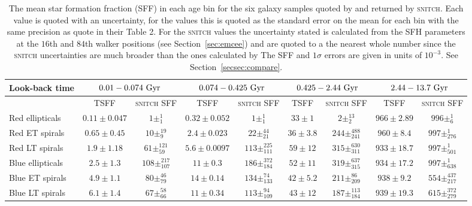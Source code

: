 \documentclass[useAMS,usenatbib]{mn2e}
\begin{document}
\begin{table*}
\centering
\caption{The mean star formation fraction (SFF) in each age bin for the six galaxy samples quoted by \protect\cite[][TSFF]{tojeiro13} and returned by \textsc{snitch}. Each value is quoted with an uncertainty, for the \protect\cite{tojeiro13} values this is quoted as the standard error on the mean for each bin with the same precision as \protect\citeauthor{tojeiro13} quote in their Table 2. For the \textsc{snitch} values the uncertainty stated is calculated from the SFH parameters at the $16$th and $84$th walker positions (see Section~\ref{sec:emcee}) and are quoted to a the nearest whole number since the \textsc{snitch} uncertainties are much broader than the ones calculated by \protect\citeauthor{tojeiro13} The SFF and $1\sigma$ errors are given in units of $10^{-3}$. See Section~\ref{secsec:compare}.}
\label{table:tojeirocompare}
\begin{tabular*}{\textwidth}{l|cc|cc|cc|cc}
                        Look-back time & \multicolumn{2}{c|}{$0.01 - 0.074~\rm{Gyr}$}     & \multicolumn{2}{c|}{$0.074 - 0.425~\rm{Gyr}$} & \multicolumn{2}{c|}{$0.425 - 2.44~\rm{Gyr}$} & \multicolumn{2}{c}{$2.44 - 13.7~\rm{Gyr}$} \\ \hline
                        & TSFF & \textsc{snitch} SFF & TSFF          & \textsc{snitch} SFF          & TSFF          & \textsc{snitch} SFF         & TSFF         & \textsc{snitch} SFF        \\ \hline
Red ellipticals         & $0.11\pm0.047$   &  $1\pm_{1}^{1}$ &  $0.32\pm0.052$  &    $1\pm_{1}^{1}$   &  $33\pm1$   &   $2\pm_{2}^{13}$   &  $966\pm2.89$  &   $996\pm_{6}^{1}$   \\
Red ET spirals  & $0.65\pm0.45$   &  $10\pm_{9}^{19}$ &  $2.4\pm0.023$   &  $22\pm_{21}^{44}$     &  $36\pm3.8$   &   $244\pm_{241}^{488}$  &  $960\pm8.4$  &  $997\pm_{276}^{1}$    \\
Red LT spirals   &  $1.9\pm1.18$   &  $61\pm_{59}^{121}$  &  $5.6\pm0.0097$   &   $113\pm_{111}^{225}$    &  $59\pm12$   &   $315\pm_{311}^{630}$   &  $933\pm18.7$  &   $997\pm_{501}^{1}$    \\ \hline
Blue ellipticals        &  $2.5\pm1.3$   &  $108\pm_{107}^{217}$   &  $11\pm0.3$    &   $186\pm_{184}^{372}$    &  $52\pm11$   &   $319\pm_{315}^{637}$   &  $934\pm17.2$  &     $997\pm_{638}^{1}$ \\
Blue ET spirals &  $4.9\pm1.1$   &  $80\pm_{79}^{46}$  &  $14\pm0.14$    &   $134\pm_{133}^{74}$    &  $42\pm5.2$   &   $211\pm_{209}^{86}$   &  $938\pm9.2$  &  $554\pm_{217}^{437}$     \\
Blue LT spirals  &  $6.1\pm1.4$   &  $67\pm_{66}^{58}$  &  $11\pm0.34$   &   $113\pm_{109}^{94}$    &  $43\pm12$   &    $187\pm_{184}^{113}$  &  $939\pm19.3$  & $615\pm_{279}^{372}$                              
\end{tabular*}
\end{table*}
\end{document}
